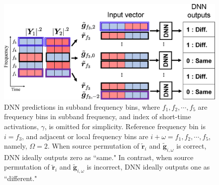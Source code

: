 \begin{figure}[t]
    \begin{center}
        \includegraphics[width=1.0\columnwidth]{figures/local_dnn}
    \end{center}
    \vspace{-8pt}
	\caption{DNN predictions in subband frequency bins, where $f_1, f_2, \cdots, f_5$ are frequency bins in subband frequency, and index of short-time activations, $\gamma$, is omitted for simplicity. Reference frequency bin is $i=f_3$, and adjacent or local frequency bins are $i+\omega=f_1, f_2, \cdots, f_5$, namely, $\Omega = 2$. When source permutation of $\tilde{\bm{r}}_{i}$ and $\tilde{\bm{g}}_{i,\omega}$ is correct, DNN ideally outputs zero as ``same." In contrast, when source permutation of $\tilde{\bm{r}}_{i}$ and $\tilde{\bm{g}}_{i,\omega}$ is incorrect, DNN ideally outputs one as ``different."}
	\label{fig:local_dnn}
\end{figure}

\clearpage
